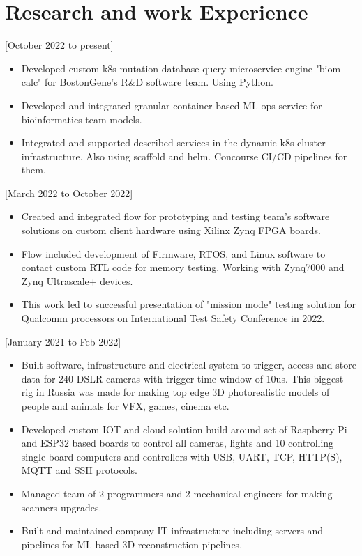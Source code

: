 \documentclass{article}
\begin{document}
\section{Research and work Experience}


[October 2022 to present]
   \begin{itemize}
      \item Developed custom k8s mutation database query microservice engine "biom-calc" for BostonGene's R\&D software team. Using Python.
      \item Developed and integrated granular container based ML-ops service for bioinformatics team models.
      \item Integrated and supported described services in the dynamic k8s cluster infrastructure. Also using scaffold and helm. Concourse CI/CD pipelines for them.
    \end{itemize}

[March 2022 to October 2022]
   \begin{itemize}
      \item Created and integrated flow for prototyping and testing team's software solutions on custom client hardware using Xilinx Zynq FPGA boards.
      \item Flow included development of Firmware, RTOS, and Linux software to contact custom RTL code for memory testing. Working with Zynq7000 and Zynq Ultrascale+ devices.
      \item This work led to successful presentation of "mission mode" testing solution for Qualcomm processors on International Test Safety Conference in 2022.
   \end{itemize}  

[January 2021 to Feb 2022]
\begin{itemize}
   \item Built software, infrastructure and electrical system to trigger, access and store data for 240 DSLR cameras with trigger time window of 10us. This biggest rig in Russia was made for making top edge 3D photorealistic models of people and animals for VFX, games, cinema etc.
   \item Developed custom IOT and cloud solution build around set of Raspberry Pi and ESP32 based boards to control all cameras, lights and 10 controlling single-board computers and controllers with USB, UART, TCP, HTTP(S), MQTT and SSH protocols.
   \item Managed team of 2 programmers and 2 mechanical engineers for making scanners upgrades.
   \item Built and maintained company IT infrastructure including servers and pipelines for ML-based 3D reconstruction pipelines.
\end{itemize}
\end{document}
